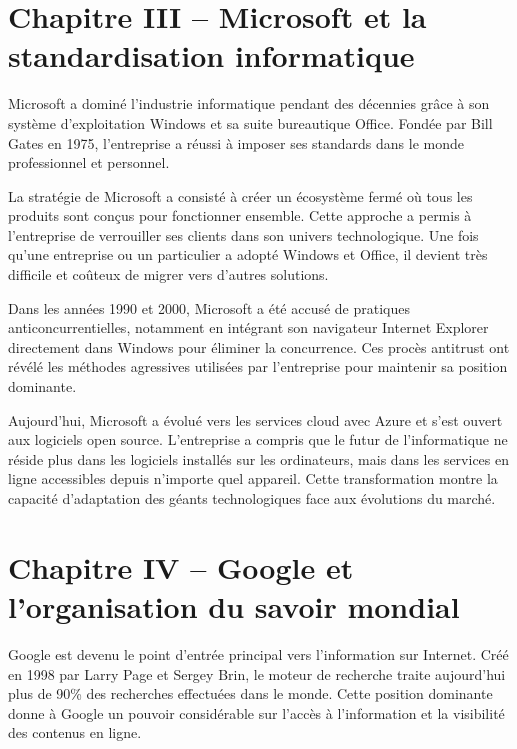 \documentclass[12pt,a4paper]{article}
\begin{document}
\newpage

\section*{Chapitre III -- Microsoft et la standardisation informatique}

Microsoft a dominé l'industrie informatique pendant des décennies grâce à son système d'exploitation Windows et sa suite bureautique Office. Fondée par Bill Gates en 1975, l'entreprise a réussi à imposer ses standards dans le monde professionnel et personnel.

La stratégie de Microsoft a consisté à créer un écosystème fermé où tous les produits sont conçus pour fonctionner ensemble. Cette approche a permis à l'entreprise de verrouiller ses clients dans son univers technologique. Une fois qu'une entreprise ou un particulier a adopté Windows et Office, il devient très difficile et coûteux de migrer vers d'autres solutions.

Dans les années 1990 et 2000, Microsoft a été accusé de pratiques anticoncurrentielles, notamment en intégrant son navigateur Internet Explorer directement dans Windows pour éliminer la concurrence. Ces procès antitrust ont révélé les méthodes agressives utilisées par l'entreprise pour maintenir sa position dominante.

Aujourd'hui, Microsoft a évolué vers les services cloud avec Azure et s'est ouvert aux logiciels open source. L'entreprise a compris que le futur de l'informatique ne réside plus dans les logiciels installés sur les ordinateurs, mais dans les services en ligne accessibles depuis n'importe quel appareil. Cette transformation montre la capacité d'adaptation des géants technologiques face aux évolutions du marché.

\newpage

\section*{Chapitre IV -- Google et l'organisation du savoir mondial}

Google est devenu le point d'entrée principal vers l'information sur Internet. Créé en 1998 par Larry Page et Sergey Brin, le moteur de recherche traite aujourd'hui plus de 90\% des recherches effectuées dans le monde. Cette position dominante donne à Google un pouvoir considérable sur l'accès à l'information et la visibilité des contenus en ligne.
\end{document}
